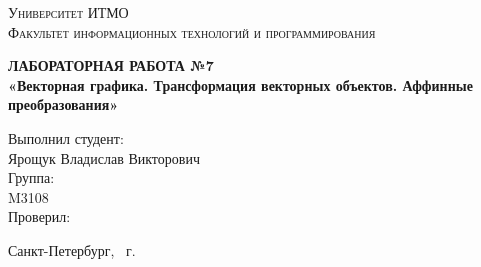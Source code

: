 \begin{titlepage}
\begin{center}
\textsc{
Университет ИТМО\\[3mm]
Факультет информационных технологий и программирования}

\vfill

\textbf{
ЛАБОРАТОРНАЯ РАБОТА №7\\[3mm]
«Векторная графика. Трансформация векторных объектов. Аффинные преобразования»\\[20mm]}
\end{center}

\hfill
\begin{minipage}{.5\textwidth}
Выполнил студент:\\[2mm] 
Ярощук Владислав Викторович\\[4mm]
Группа:\\[2mm]
M3108\\[5mm]

Проверил:\\[7mm] 
\end{minipage}%
\vfill
\begin{center}
Санкт-Петербург, \theyear\ г.
\end{center}
\end{titlepage}
